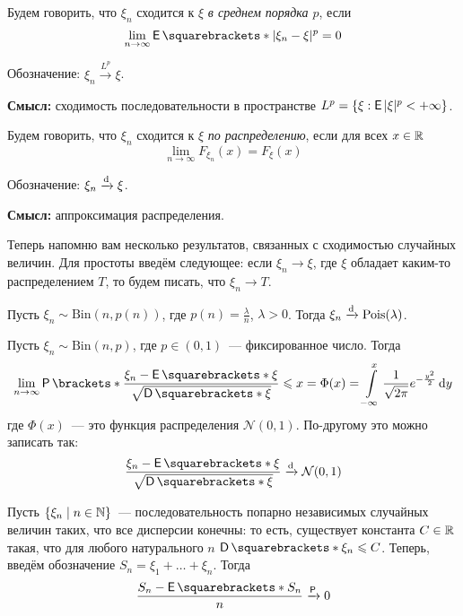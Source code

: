 \begin{definition}
	Будем говорить, что \(\xi_n\) сходится к \(\xi\) \emph{в среднем порядка \(p\)}, если
	\[
	\lim\limits_{n \to \infty} \E{|\xi_n - \xi|^p} = 0
	\]
	
	Обозначение: \(\xi_n \xrightarrow{L^p} \xi\).
\end{definition}

\textbf{Смысл:} сходимость последовательности в пространстве \(L^{p} = \{\xi : \E|\xi|^p < +\infty\}\).

\begin{definition}
	Будем говорить, что \(\xi_n\) сходится к \(\xi\) \emph{по распределению}, если для всех \(x \in \mathbb{R}\)
	\[
	\lim\limits_{n \to \infty} F_{\xi_n}(x) = F_{\xi}(x)
	\]
	
	Обозначение: \(\xi_n \xrightarrow{\mathrm{d}} \xi\).
\end{definition}

\textbf{Смысл:} аппроксимация распределения.

Теперь напомню вам несколько результатов, связанных с сходимостью случайных величин. Для простоты введём следующее: если \(\xi_n \to \xi\), где \(\xi\) обладает каким-то распределением \(T\), то будем писать, что \(\xi_n \to T\).

\begin{theorem}[Пуассон]
	Пусть \(\xi_n \sim \mathrm{Bin}(n, p(n))\), где \(p(n) = \frac{\lambda}{n}\), \(\lambda > 0\). Тогда \(\xi_n \xrightarrow{\mathrm{d}} \mathrm{Pois}(\lambda)\). 
\end{theorem}
\begin{theorem}
	Пусть \(\xi_n \sim \mathrm{Bin}(n, p)\), где \(p \in (0, 1)\)~--- фиксированное число. Тогда
	\[
		\lim\limits_{n \to \infty} \Pr{\frac{\xi_n - \E{\xi}}{\sqrt{\D{\xi}}} \leq x} = \Phi(x) = \int\limits_{-\infty}^{x} \frac{1}{\sqrt{2\pi}}e^{-\frac{y^2}{2}}\diff y
	\]
	где \(\Phi(x)\)~--- это функция распределения \(\mathcal{N}(0, 1)\). По-другому это можно записать так:
	\[
		\frac{\xi_n - \E{\xi}}{\sqrt{\D{\xi}}} \dto \mathcal{N}(0, 1)
	\]
\end{theorem}
\begin{theorem}
	Пусть \(\{\xi_n \mid n \in \mathbb{N}\}\)~--- последовательность попарно независимых случайных величин таких, что все дисперсии конечны: то есть, существует константа \(C \in \mathbb{R}\) такая, что для любого натурального \(n\) \(\D{\xi_n} \leq C\). Теперь, введём обозначение \(S_n = \xi_1 + \dots + \xi_n\). Тогда
	\[
		\frac{S_n - \E{S_n}}{n} \prto 0
	\]
\end{theorem}

